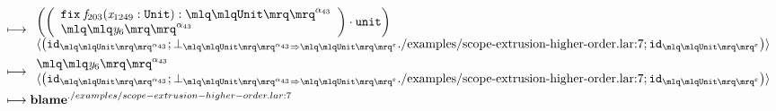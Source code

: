 \documentclass{article}
\begin{document}
\begin{align*}
\longmapsto &\;\begin{array}{l}\left(\left(\begin{array}{l} \mathtt{fix}\; \mathit{f}_{203}(\mathit{x}_{1249}:\mathtt{Unit}): \quot{\mathtt{Unit}}^{\mathit{\alpha}_{43}}\\\quot{\mathit{y}_{6}}^{\mathit{\alpha}_{43}}\end{array}\right)\cdot \mathtt{unit}\right)\\\langle\left(\mathtt{id}_{\quot{\mathtt{Unit}}^{\mathit{\alpha}_{43}}};\bot_{\quot{\mathtt{Unit}}^{\mathit{\alpha}_{43}}\Rightarrow\quot{\mathtt{Unit}}^{\varepsilon}}\text{./examples/scope-extrusion-higher-order.lar:7};\mathtt{id}_{\quot{\mathtt{Unit}}^{\varepsilon}}\right)\rangle\end{array}\\ 
\longmapsto &\;\begin{array}{l}\quot{\mathit{y}_{6}}^{\mathit{\alpha}_{43}}\\\langle\left(\mathtt{id}_{\quot{\mathtt{Unit}}^{\mathit{\alpha}_{43}}};\bot_{\quot{\mathtt{Unit}}^{\mathit{\alpha}_{43}}\Rightarrow\quot{\mathtt{Unit}}^{\varepsilon}}\text{./examples/scope-extrusion-higher-order.lar:7};\mathtt{id}_{\quot{\mathtt{Unit}}^{\varepsilon}}\right)\rangle\end{array}\\ 
\longmapsto &\;\mathbf{blame}^{./examples/scope-extrusion-higher-order.lar:7}\end{align*}
\end{document}
